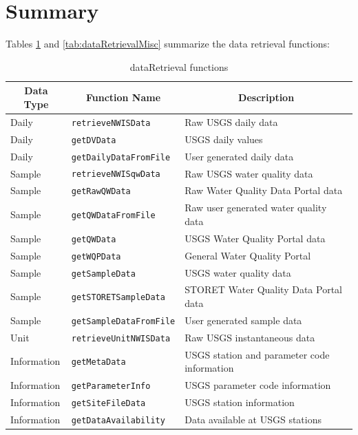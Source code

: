 \documentclass[a4paper,11pt]{article}\usepackage[]{graphicx}\usepackage[]{color}
\begin{document}
\FloatBarrier
\clearpage


\section{Summary}
\label{sec:summary}

Tables \ref{tab:dataRetrievalFunctions1} and \ref{tab:dataRetrievalMisc} summarize the data retrieval functions:

\begin{table}
{\footnotesize
  \begin{threeparttable}[b]
  \caption{dataRetrieval functions}
  \label{tab:dataRetrievalFunctions1}
\begin{tabular}{lll}
  \hline
\multicolumn{1}{c}{\textbf{\textsf{Data Type}}} &
\multicolumn{1}{c}{\textbf{\textsf{Function Name}}} &
\multicolumn{1}{c}{\textbf{\textsf{Description}}} \\ [0pt]
  \hline
  Daily & \texttt{retrieveNWISData} & Raw USGS daily data \\ 
  [5pt]Daily\tnote{1} & \texttt{getDVData} & USGS daily values \\ 
  [5pt]Daily\tnote{1} & \texttt{getDailyDataFromFile} & User generated daily data \\ 
  [5pt]Sample & \texttt{retrieveNWISqwData} & Raw USGS water quality data \\
  [5pt]Sample & \texttt{getRawQWData} & Raw Water Quality Data Portal data \\ 
  [5pt]Sample & \texttt{getQWDataFromFile} & Raw user generated water quality data \\ 
  [5pt]Sample & \texttt{getQWData} & USGS Water Quality Portal data \\
  [5pt]Sample & \texttt{getWQPData} & General Water Quality Portal\\
  [5pt]Sample\tnote{1} & \texttt{getSampleData} & USGS water quality data\\
  [5pt]Sample\tnote{1} & \texttt{getSTORETSampleData} & STORET Water Quality Data Portal data \\
  [5pt]Sample\tnote{1} & \texttt{getSampleDataFromFile} & User generated sample data \\ 
  [5pt]Unit & \texttt{retrieveUnitNWISData} & Raw USGS instantaneous data \\
  [5pt]Information\tnote{1} & \texttt{getMetaData} & USGS station and parameter code information \\ 
  [5pt]Information & \texttt{getParameterInfo} & USGS parameter code information \\ 
  [5pt]Information & \texttt{getSiteFileData} & USGS station information \\ 
  [5pt]Information & \texttt{getDataAvailability} & Data available at USGS stations \\ 
   \hline
\end{tabular}


\end{threeparttable}}
\end{table}
\end{document}
